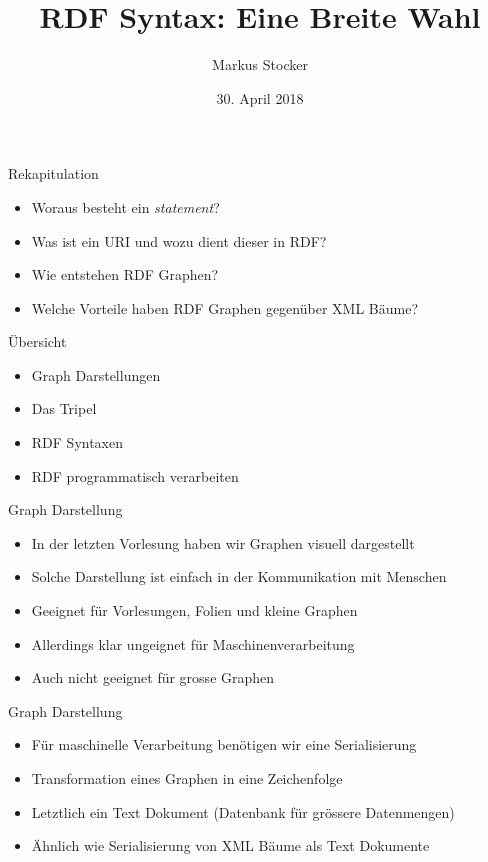 \documentclass{beamer}
\title{RDF Syntax: Eine Breite Wahl}
\author{Markus Stocker}
\date{30. April 2018}
\begin{document}
\maketitle

\begin{frame}{Rekapitulation}
	
	\begin{itemize}
		\item Woraus besteht ein \emph{statement}?
		\item Was ist ein URI und wozu dient dieser in RDF?
		\item Wie entstehen RDF Graphen?
		\item Welche Vorteile haben RDF Graphen gegenüber XML Bäume?
	\end{itemize}
	
\end{frame}

\begin{frame}{Übersicht}
	
	\begin{itemize}
		\item Graph Darstellungen
		\item Das Tripel
		\item RDF Syntaxen
		\item RDF programmatisch verarbeiten
	\end{itemize}
	
\end{frame}

\begin{frame}{Graph Darstellung}
	
	\begin{itemize}
		\item In der letzten Vorlesung haben wir Graphen visuell dargestellt
		\item Solche Darstellung ist einfach in der Kommunikation mit Menschen
		\item Geeignet für Vorlesungen, Folien und kleine Graphen
		\item Allerdings klar ungeignet für Maschinenverarbeitung
		\item Auch nicht geeignet für grosse Graphen
	\end{itemize}
	
\end{frame}

\begin{frame}{Graph Darstellung}
	
	\begin{itemize}
		\item Für maschinelle Verarbeitung benötigen wir eine Serialisierung
		\item Transformation eines Graphen in eine Zeichenfolge
		\item Letztlich ein Text Dokument (Datenbank für grössere Datenmengen)
		\item Ähnlich wie Serialisierung von XML Bäume als Text Dokumente
	\end{itemize}
	
\end{frame}
\end{document}
